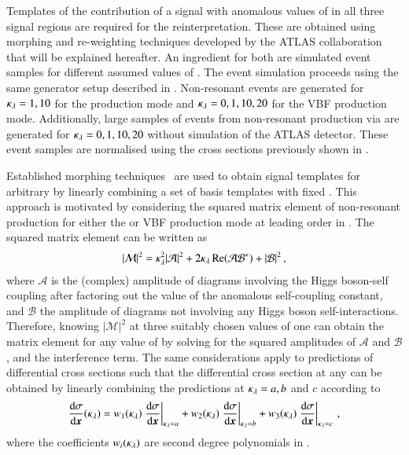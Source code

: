Templates of the contribution of a signal with anomalous values of
\klambda in all three signal regions are required for the
reinterpretation. These are obtained using morphing and re-weighting
techniques developed by the ATLAS collaboration that will be explained
hereafter. An ingredient for both are simulated event samples for
different assumed values of \klambda. The event simulation proceeds
using the same generator setup described in
. Non-resonant \HH events are generated
for $\kappa_{\lambda} = 1, 10$ for the \ggF production mode and
$\kappa_{\lambda} = 0, 1, 10, 20$ for the VBF production mode. Additionally,
large samples of events from non-resonant \HH production via \ggF are
generated for $\kappa_{\lambda} = 0, 1, 10, 20$ without simulation of the
ATLAS detector. These event samples are normalised using the cross
sections previously shown in .

Established morphing techniques~\cite{ATL-PHYS-PUB-2015-047} are used
to obtain signal templates for arbitrary \klambda by linearly
combining a set of basis templates with fixed \klambda. This approach
is motivated by considering the squared matrix element of non-resonant
\HH production for either the \ggF or VBF production mode at leading
order in \klambda. The squared matrix element can be written as
\begin{align*}
  |\mathcal{M}|^2 = \kappa_{\lambda}^2 |\mathcal{A}|^2 + 2 \kappa_{\lambda} \operatorname{Re}(\mathcal{A} \mathcal{B}^*) + |\mathcal{B}|^2 \,\text{,}
\end{align*}
where $\mathcal{A}$ is the (complex) amplitude of diagrams involving
the Higgs boson-self coupling after factoring out the value of the
anomalous self-coupling constant, and $\mathcal{B}$ the amplitude of
diagrams not involving any Higgs boson self-interactions. Therefore,
knowing $|\mathcal{M}|^2$ at three suitably chosen values of \klambda
one can obtain the matrix element for any value of \klambda by solving
for the squared amplitudes of $\mathcal{A}$ and $\mathcal{B}$, and the
interference term. The same considerations apply to predictions of
differential cross sections such that the differential cross section
at any \klambda can be obtained by linearly combining the predictions
at $\kappa_{\lambda} = a, b$ and $c$ according to
\begin{align*}
  \frac{\mathrm{d}\sigma}{\mathrm{d}\myvec{x}}(\klambda)
  = w_1(\klambda) \left. \frac{\mathrm{d}\sigma}{\mathrm{d}\myvec{x}} \right|_{\klambda = a}
  + w_2(\klambda) \left. \frac{\mathrm{d}\sigma}{\mathrm{d}\myvec{x}} \right|_{\klambda = b}
  + w_3(\klambda) \left. \frac{\mathrm{d}\sigma}{\mathrm{d}\myvec{x}} \right|_{\klambda = c} \,\text{,}
\end{align*}
where the coefficients $w_i(\kappa_{\lambda})$ are second degree polynomials
in \klambda.

